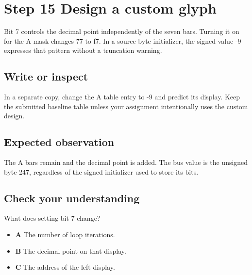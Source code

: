 \section{Step 15 Design a custom
  glyph}\label{005-seven-segment-counter-s15-step-15-design-a-custom-glyph}

Bit 7 controls the decimal point independently of the seven bars.
Turning it on for the A mask changes 77 to f7. In a source byte
initializer, the signed value -9 expresses that pattern without a
truncation warning.

\subsection{Write or
  inspect}\label{005-seven-segment-counter-s15-write-or-inspect}

In a separate copy, change the A table entry to -9 and predict its
display. Keep the submitted baseline table unless your assignment
intentionally uses the custom design.

\subsection{Expected
  observation}\label{005-seven-segment-counter-s15-expected-observation}

The A bars remain and the decimal point is added. The bus value is the
unsigned byte 247, regardless of the signed initializer used to store
its bits.

\subsection{Check your
  understanding}\label{005-seven-segment-counter-s15-check-your-understanding}

What does setting bit 7 change?

\begin{itemize}
  \tightlist
  \item
        \textbf{A} The number of loop iterations.
  \item
        \textbf{B} The decimal point on that display.
  \item
        \textbf{C} The address of the left display.
\end{itemize}
